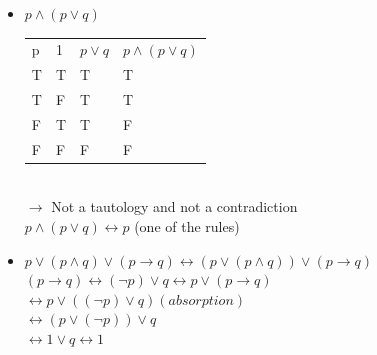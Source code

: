 \documentclass[9pt, letterpaper, oneside]{article}
\begin{document}
\begin{itemize}
\item $p \wedge (p \vee q)$\\
\begin{tabular}{| l | l | l | l | }
  p & 1 & $p \vee q$  & $p \wedge (p \vee q)$\\
  T & T & T & T \\
  T & F & T & T \\
  F & T & T & F \\
  F & F & F & F \\
\end{tabular} \\
$\to$ Not a tautology and not a contradiction \\
$p \wedge (p \vee q) \leftrightarrow p$ (one of the rules)
\item $p \vee (p \wedge q) \vee (p \to q) \leftrightarrow (p \vee (p \wedge q)) \vee (p \to q)$ \\
$(p \to q) \leftrightarrow (\neg p) \vee q \leftrightarrow p \vee (p \to q)$\\
$\leftrightarrow p \vee ((\neg p) \vee q) (absorption)$\\
$\leftrightarrow (p \vee (\neg p))\vee q$\\
$\leftrightarrow 1 \vee q \leftrightarrow 1$
\end{itemize}
\end{document}
